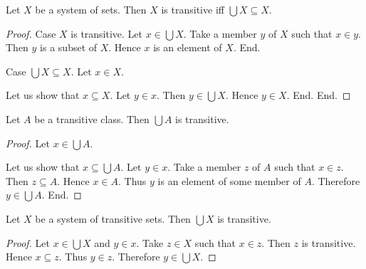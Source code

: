 \documentclass[10pt]{article}
\begin{document}
  \begin{forthel}
    \begin{proposition}
      Let $X$ be a system of sets.
      Then $X$ is transitive iff $\bigcup X \subseteq X$.
    \end{proposition}
    \begin{proof}
      Case $X$ is transitive.
        Let $x \in \bigcup X$.
        Take a member $y$ of $X$ such that $x \in y$.
        Then $y$ is a subset of $X$.
        Hence $x$ is an element of $X$.
      End.

      Case $\bigcup X \subseteq X$.
        Let $x \in X$.

        Let us show that $x \subseteq X$.
          Let $y \in x$.
          Then $y \in \bigcup X$.
          Hence $y \in X$.
        End.
      End.
    \end{proof}
  \end{forthel}

  \begin{forthel}
    \begin{proposition}
      Let $A$ be a transitive class.
      Then $\bigcup A$ is transitive.
    \end{proposition}
    \begin{proof}
      Let $x \in \bigcup A$.

      Let us show that $x \subseteq \bigcup A$.
        Let $y \in x$.
        Take a member $z$ of $A$ such that $x \in z$.
        Then $z \subseteq A$.
        Hence $x \in A$.
        Thus $y$ is an element of some member of $A$.
        Therefore $y \in \bigcup A$.
      End.
    \end{proof}
  \end{forthel}

  \begin{forthel}
    \begin{proposition}
      Let $X$ be a system of transitive sets.
      Then $\bigcup X$ is transitive.
    \end{proposition}
    \begin{proof}
      Let $x \in \bigcup X$ and $y \in x$.
      Take $z \in X$ such that $x \in z$.
      Then $z$ is transitive.
      Hence $x \subseteq z$.
      Thus $y \in z$.
      Therefore $y \in \bigcup X$.
    \end{proof}
  \end{forthel}
\end{document}

